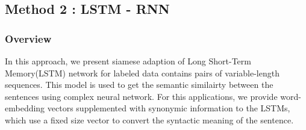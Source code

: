 \subsection{Method 2 : LSTM - RNN}
\subsubsection{Overview}
\par In this approach, we present  siamese adaption of Long Short-Term Memory(LSTM) network for labeled data contains pairs of variable-length sequences. This model is used to get the semantic similairty between the sentences using complex neural network. For this applications, we provide word-embedding vectors supplemented with synonymic information to the LSTMs, which use a fixed size vector to convert the syntactic meaning of the sentence. 

